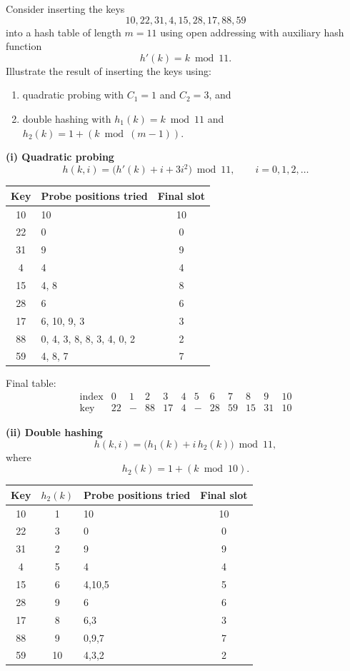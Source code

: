 \documentclass[11pt,a4paper]{article}
\begin{document}
\begin{qaquestion}
Consider inserting the keys
\[
10,22,31,4,15,28,17,88,59
\]
into a hash table of length \(m=11\) using open addressing with auxiliary hash function
\[
h'(k)=k\bmod 11.
\]
Illustrate the result of inserting the keys using:
\begin{enumerate}[label=(\roman*),leftmargin=2em]
\item quadratic probing with \(C_1=1\) and \(C_2=3\), and
\item double hashing with \(h_1(k)=k\bmod11\) and \(h_2(k)=1+(k\bmod(m-1))\).
\end{enumerate}
\end{qaquestion}

\begin{qaanswer}[Answer 1(b)]
\textbf{(i) Quadratic probing}
\[
h(k,i)=\bigl(h'(k)+i+3i^2\bigr)\bmod 11,\qquad i=0,1,2,\ldots
\]

\begin{center}
\small
\begin{tabular}{c l c}
\toprule
Key & Probe positions tried & Final slot\\
\midrule
10 & 10 & 10\\
22 & 0 & 0\\
31 & 9 & 9\\
4  & 4 & 4\\
15 & 4, 8 & 8\\
28 & 6 & 6\\
17 & 6, 10, 9, 3 & 3\\
88 & 0, 4, 3, 8, 8, 3, 4, 0, 2 & 2\\
59 & 4, 8, 7 & 7\\
\bottomrule
\end{tabular}
\end{center}

Final table:
\[
\begin{array}{c|ccccccccccc}
\text{index}&0&1&2&3&4&5&6&7&8&9&10\\ \hline
\text{key}&22&-&88&17&4&-&28&59&15&31&10
\end{array}
\]

\medskip
\textbf{(ii) Double hashing}
\[
h(k,i)=\bigl(h_1(k)+i\,h_2(k)\bigr)\bmod11,
\]
where
\[
h_2(k)=1+(k\bmod10).
\]

\begin{center}
\small
\begin{tabular}{c c l c}
\toprule
Key & \(h_2(k)\) & Probe positions tried & Final slot\\
\midrule
10 & 1 & 10 & 10\\
22 & 3 & 0 & 0\\
31 & 2 & 9 & 9\\
4  & 5 & 4 & 4\\
15 & 6 & 4,10,5 & 5\\
28 & 9 & 6 & 6\\
17 & 8 & 6,3 & 3\\
88 & 9 & 0,9,7 & 7\\
59 & 10 & 4,3,2 & 2\\
\bottomrule
\end{tabular}
\end{center}


\end{qaanswer}
\end{document}
